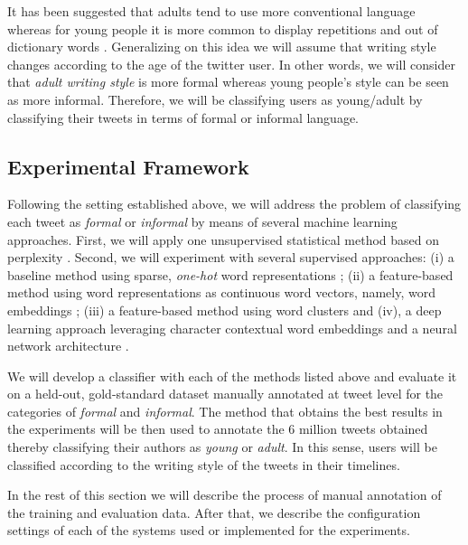 \documentclass[information,article,submit,moreauthors,pdftex,10pt,a4paper]{Definitions/mdpi}
\begin{document}
It has been suggested that adults tend to use more conventional language \cite{nguyen2013old} whereas for young people it is more common to display repetitions and out of dictionary words \citep{rao2010classifying,rosenthal2011age,morgan2017predicting}. Generalizing on this idea we will assume that writing style changes according to the age of the twitter user. In other words, we will consider that \emph{adult writing style} is more formal whereas young people's style can be seen as more informal. Therefore, we will be classifying users as young/adult by classifying their tweets in terms of formal or informal language.

\subsection{Experimental Framework}\label{sec:exper-fram}

Following the setting established above, we will address the problem of classifying each tweet as \emph{formal} or \emph{informal} by means of several machine learning approaches. First, we will apply one unsupervised statistical method based on perplexity \cite{gamallo2017language}. Second, we will experiment with several supervised approaches: (i) a baseline method using sparse, \emph{one-hot} word representations \cite{pedregosa2011scikit}; (ii) a feature-based method using word representations as continuous word vectors, namely, word embeddings \cite{mikolov2013distributed,pennington-etal-2014-glove,mikolov-etal-2018-advances}; (iii) a feature-based method using word clusters \cite{agerri2016robust,agerri2019language} and (iv), a deep learning approach leveraging character contextual word embeddings and a neural network architecture \cite{akbik2018contextual}.

We will develop a classifier with each of the methods listed above and evaluate it on a held-out, gold-standard dataset manually annotated at tweet level for the categories of \emph{formal} and \emph{informal}. The method that obtains the best results in the experiments will be then used to annotate the 6 million tweets obtained thereby classifying their authors as \emph{young} or \emph{adult}. In this sense, users will be classified according to the writing style of the tweets in their timelines.

In the rest of this section we will describe the process of manual annotation of the training and evaluation data. After that, we describe the configuration settings of each of the systems used or implemented for the experiments.
\end{document}
